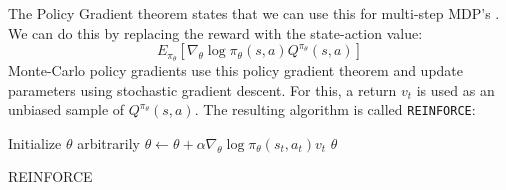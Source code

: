 \documentclass[a4paper]{article}
\begin{document}
The Policy Gradient theorem states that we can use this for multi-step MDP's \citep{Sutton1999PolicyApproximation}. We can do this by replacing the reward with the state-action value:
\begin{equation}
E_{\pi_{\theta}} [\nabla_{\theta} \log \pi_{\theta}(s,a)Q^{\pi_{\theta}}(s,a)]
\end{equation}
Monte-Carlo policy gradients use this policy gradient theorem and update parameters using stochastic gradient descent. For this, a return $v_t$ is used as an unbiased sample of $Q^{\pi_{\theta}}(s,a)$. The resulting algorithm is called \texttt{REINFORCE}:\\
\begin{algorithm}[H]
\DontPrintSemicolon
Initialize $\theta$ arbitrarily\;
 {
	 {
    	$\theta \gets \theta + \alpha \nabla_{\theta} \log \pi_{\theta}(s_t,a_t)v_t$
    }
}
\Return $\theta$
\caption{REINFORCE}
\end{algorithm}
\end{document}

